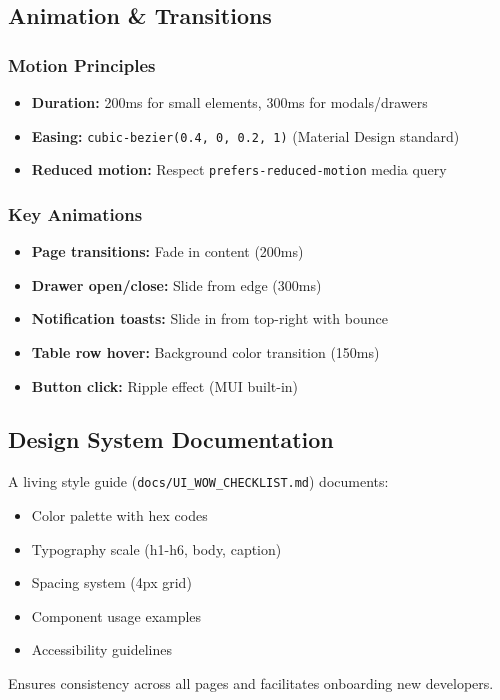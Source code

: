 \subsection{Animation \& Transitions}

\subsubsection{Motion Principles}

\begin{itemize}
    \item \textbf{Duration:} 200ms for small elements, 300ms for modals/drawers
    \item \textbf{Easing:} \texttt{cubic-bezier(0.4, 0, 0.2, 1)} (Material Design standard)
    \item \textbf{Reduced motion:} Respect \texttt{prefers-reduced-motion} media query
\end{itemize}

\subsubsection{Key Animations}

\begin{itemize}
    \item \textbf{Page transitions:} Fade in content (200ms)
    \item \textbf{Drawer open/close:} Slide from edge (300ms)
    \item \textbf{Notification toasts:} Slide in from top-right with bounce
    \item \textbf{Table row hover:} Background color transition (150ms)
    \item \textbf{Button click:} Ripple effect (MUI built-in)
\end{itemize}

\subsection{Design System Documentation}

A living style guide (\texttt{docs/UI\_WOW\_CHECKLIST.md}) documents:

\begin{itemize}
    \item Color palette with hex codes
    \item Typography scale (h1-h6, body, caption)
    \item Spacing system (4px grid)
    \item Component usage examples
    \item Accessibility guidelines
\end{itemize}

Ensures consistency across all pages and facilitates onboarding new developers.
